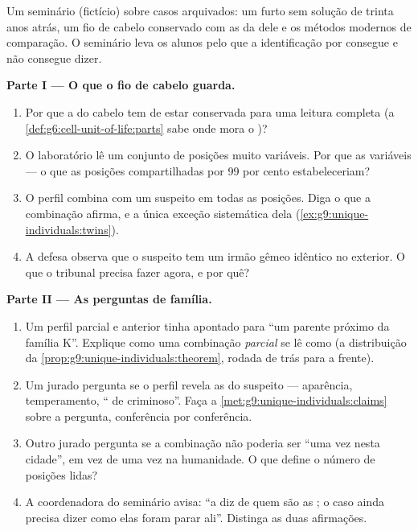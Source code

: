 \begin{problem}\label{pb:g9:unique-individuals:1}
Um seminário (fictício) sobre casos arquivados: um furto sem
solução de trinta anos atrás, um fio de cabelo conservado com
as  da  dele e os métodos modernos de comparação.
O seminário leva os alunos pelo que a identificação por 
consegue e não consegue dizer.

\medskip\noindent\textbf{Parte I --- O que o fio de cabelo
guarda.}
\begin{enumerate}
  \item Por que a \emph{} do cabelo tem de estar
        conservada para uma leitura completa (a
        \cref{def:g6:cell-unit-of-life:parts} sabe onde mora
        o )?
  \item O laboratório lê um conjunto de posições muito
        variáveis. Por que as variáveis --- o que as posições
        compartilhadas por 99 por cento estabeleceriam?
  \item O perfil combina com um suspeito em todas as
        posições. Diga o que a combinação afirma, e a única
        exceção sistemática dela
        (\cref{ex:g9:unique-individuals:twins}).
  \item A defesa observa que o suspeito tem um irmão gêmeo
        idêntico no exterior. O que o tribunal precisa fazer
        agora, e por quê?
\end{enumerate}

\medskip\noindent\textbf{Parte II --- As perguntas de
família.}
\begin{enumerate}[resume]
  \item Um perfil parcial e anterior tinha apontado para
        ``um parente próximo da família K''. Explique como
        uma combinação \emph{parcial} se lê como 
        (a distribuição da
        \cref{prop:g9:unique-individuals:theorem}, rodada de
        trás para a frente).
  \item Um jurado pergunta se o perfil revela as
         do suspeito --- aparência,
        temperamento, `` de criminoso''. Faça a
        \cref{met:g9:unique-individuals:claims} sobre a
        pergunta, conferência por conferência.
  \item Outro jurado pergunta se a combinação não poderia
        ser ``uma vez nesta cidade'', em vez de uma vez na
        humanidade. O que define o número de posições lidas?
  \item A coordenadora do seminário avisa: ``a  diz
        de quem são as ; o caso ainda precisa dizer
        como elas foram parar ali''. Distinga as duas
        afirmações.
\end{enumerate}


\end{problem}
